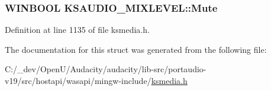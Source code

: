 \subsubsection[{\texorpdfstring{Mute}{Mute}}]{\setlength{\rightskip}{0pt plus 5cm}W\+I\+N\+B\+O\+OL K\+S\+A\+U\+D\+I\+O\+\_\+\+M\+I\+X\+L\+E\+V\+E\+L\+::\+Mute}\hypertarget{struct_k_s_a_u_d_i_o___m_i_x_l_e_v_e_l_a13b95951eab748d7ba968a019aab96b8}{}\label{struct_k_s_a_u_d_i_o___m_i_x_l_e_v_e_l_a13b95951eab748d7ba968a019aab96b8}


Definition at line 1135 of file ksmedia.\+h.



The documentation for this struct was generated from the following file\+:\begin{DoxyCompactItemize}
\item 
C\+:/\+\_\+dev/\+Open\+U/\+Audacity/audacity/lib-\/src/portaudio-\/v19/src/hostapi/wasapi/mingw-\/include/\hyperlink{ksmedia_8h}{ksmedia.\+h}\end{DoxyCompactItemize}
